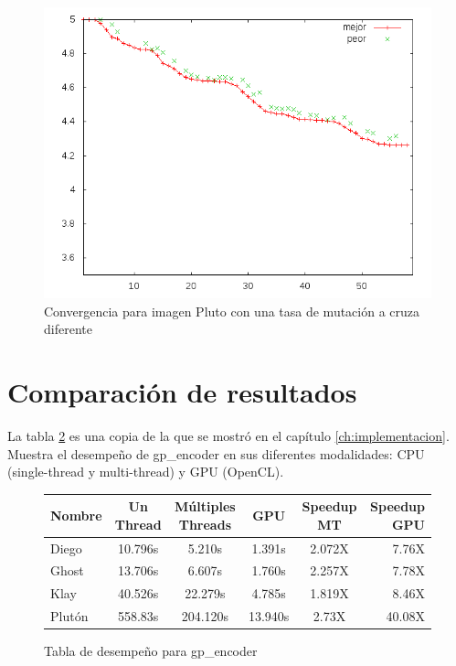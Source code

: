 \begin{figure}
    \includegraphics[width=1.0\textwidth]{plot_pluto_tweak}
    \caption{Convergencia para imagen Pluto con una tasa de mutación a cruza diferente}
    \label{img:plot-pluto2}
\end{figure}

\section{Comparación de resultados}

La tabla \ref{fig:perf_table} es una copia de la que se mostró en el capítulo
\ref{ch:implementacion}. Muestra el desempeño de gp\_encoder en sus
diferentes modalidades: CPU (single-thread y multi-thread) y GPU (OpenCL).

\begin{figure}[h!]
    \begin{tabular}{ |l c c c c r| }
        \hline
        Nombre &  Un Thread & Múltiples Threads & GPU & Speedup MT & Speedup GPU \\
        \hline
        Diego & 10.796s & 5.210s & 1.391s  & 2.072X & 7.76X \\
        Ghost & 13.706s & 6.607s & 1.760s  & 2.257X & 7.78X \\
        Klay & 40.526s & 22.279s & 4.785s  & 1.819X & 8.46X \\%
        Plutón & 558.83s & 204.120s & 13.940s & 2.73X & 40.08X \\ %
        \hline
    \end{tabular}
    \caption{Tabla de desempeño para gp\_encoder}
    \label{fig:perf_table}
\end{figure}

